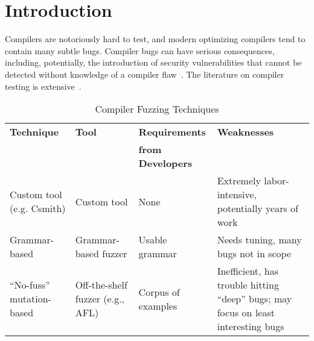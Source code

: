 \section{Introduction}

Compilers are notoriously hard to test, and modern optimizing
compilers tend to contain many subtle bugs.  Compiler bugs can have
serious consequences, including, potentially, the introduction of
security vulnerabilities that cannot be detected without knowledge of a compiler flaw~\cite{CompBug}.   The
literature on compiler testing is extensive~\cite{chen2020survey}.

\small
\begin{table*}
\caption{Compiler Fuzzing Techniques}  
\centering
\begin{tabular}{p{35mm}p{31mm}p{30mm}p{67mm}}
\toprule
\bf Technique & \bf Tool & \bf Requirements    & \bf Weaknesses \\
              &          & \bf from Developers &                \\
\rowcolor{LLGray}
Custom tool (e.g. Csmith)  
& Custom tool 
& None 
& Extremely labor-intensive, potentially years of work
\\
Grammar-based              
& Grammar-based fuzzer             
& Usable grammar 
& Needs tuning, many bugs not in scope 
\\
\rowcolor{LLGray}
``No-fuss'' mutation-based 
& Off-the-shelf fuzzer \newline (e.g., AFL) 
& Corpus of examples 
& Inefficient, has trouble hitting ``deep'' bugs; may focus on
                        least interesting bugs
  \\
\bottomrule
\end{tabular}
\label{tab:techniques}
\end{table*}
\normalsize


